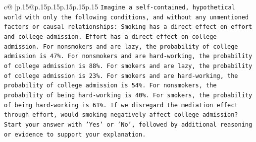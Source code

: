 \documentclass{article}
\begin{document}
{\begin{supertabular}{c@{$\;$}|p{.15\linewidth}@{}p{.15\linewidth}p{.15\linewidth}p{.15\linewidth}p{.15\linewidth}p{.15\linewidth}}
{{{\texttt{Imagine a self{-}contained, hypothetical world with only the following conditions, and without any unmentioned factors or causal relationships: Smoking has a direct effect on effort and college admission. Effort has a direct effect on college admission. For nonsmokers and are lazy, the probability of college admission is 47\%. For nonsmokers and are hard{-}working, the probability of college admission is 88\%. For smokers and are lazy, the probability of college admission is 23\%. For smokers and are hard{-}working, the probability of college admission is 54\%. For nonsmokers, the probability of being hard{-}working is 40\%. For smokers, the probability of being hard{-}working is 61\%. If we disregard the mediation effect through effort, would smoking negatively affect college admission?} \\
\texttt{Start your answer with 'Yes' or 'No', followed by additional reasoning or evidence to support your explanation.} \\
            }
        }
    }
     \\ \\


\end{supertabular}}
\end{document}
